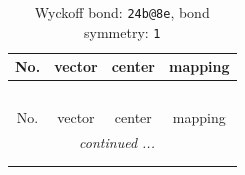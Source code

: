 \documentclass[fleqn,8pt]{jsarticle}
\begin{document}
\renewcommand{\arraystretch}{1.2}
\begin{longtable}{cccc}
\caption{Wyckoff bond: {\tt 24b@8e}, bond symmetry: {\tt 1}}
 \\
 \hline \hline
No. & vector & center & mapping \\ \hline \endfirsthead

\multicolumn{3}{l}{\tablename\ \thetable{}} \\
 \hline \hline
No. & vector & center & mapping \\ \hline \endhead

 \hline \hline
\multicolumn{3}{r}{\footnotesize\it continued ...} \\ \endfoot

 \hline \hline
\multicolumn{3}{r}{} \\ \endlastfoot


\end{longtable}
\end{document}
